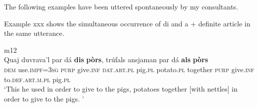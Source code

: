The following examples have been uttered spontaneously by my consultants.

Example xxx shows the simultaneous occurrence of di and a + definite article in the same utterance.

\ea\label{}
 {m12}\\
\gll   Quaj duvrava’l par dá \textbf{dis} \textbf{pòrs}, trúfals ansjaman par dá \textbf{als} \textbf{pòrs} \\
    \textsc{dem} use.\textsc{impf=3sg} \textsc{purp} give.\textsc{inf} \textsc{dat.art.pl} pig.\textsc{pl} potato.\textsc{pl} together \textsc{purp} give.\textsc{inf} to.\textsc{def.art.m.pl} pig.\textsc{pl} \\
\glt `This he used in order to give to the pigs, potatoes together [with nettles] in order to give to the pigs. '
\z


